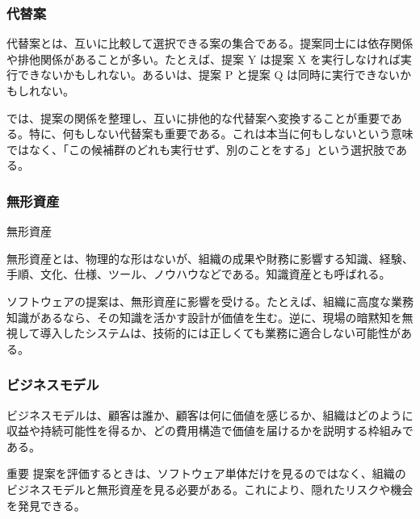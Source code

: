 \subsubsection{代替案}

代替案とは、互いに比較して選択できる案の集合である。提案同士には依存関係や排他関係があることが多い。たとえば、提案 Y は提案 X を実行しなければ実行できないかもしれない。あるいは、提案 P と提案 Q は同時に実行できないかもしれない。

では、提案の関係を整理し、互いに排他的な代替案へ変換することが重要である。特に、何もしない代替案も重要である。これは本当に何もしないという意味ではなく、「この候補群のどれも実行せず、別のことをする」という選択肢である。

\subsubsection{無形資産}

\begin{definitionbox}無形資産\par\smallskip
無形資産とは、物理的な形はないが、組織の成果や財務に影響する知識、経験、手順、文化、仕様、ツール、ノウハウなどである。知識資産とも呼ばれる。
\end{definitionbox}

ソフトウェアの提案は、無形資産に影響を受ける。たとえば、組織に高度な業務知識があるなら、その知識を活かす設計が価値を生む。逆に、現場の暗黙知を無視して導入したシステムは、技術的には正しくても業務に適合しない可能性がある。

\subsubsection{ビジネスモデル}

ビジネスモデルは、顧客は誰か、顧客は何に価値を感じるか、組織はどのように収益や持続可能性を得るか、どの費用構造で価値を届けるかを説明する枠組みである。

\begin{pointbox}{重要}
提案を評価するときは、ソフトウェア単体だけを見るのではなく、組織のビジネスモデルと無形資産を見る必要がある。これにより、隠れたリスクや機会を発見できる。
\end{pointbox}
